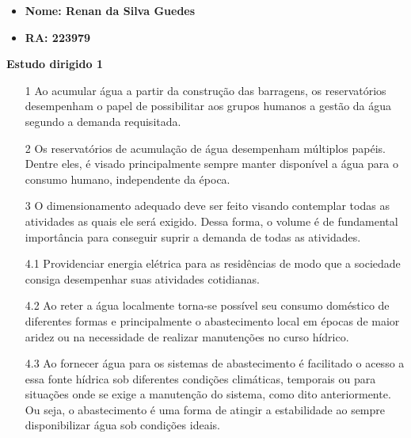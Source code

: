 \documentclass[a4paper, 12pt]{article}
\begin{document}
    \begin{itemize}
        \item\textbf{Nome: Renan da Silva Guedes}
        \item\textbf{RA: 223979}
    \end{itemize}
    
    \begin{center}
        \begin{large}
            \textbf{Estudo dirigido 1}
        \end{large}
    \end{center}
    
    \begin{enumerate}
        \item[1] Ao acumular água a partir da construção das barragens, os reservatórios desempenham o papel de possibilitar aos grupos humanos a gestão da água segundo a demanda requisitada. 
        
        \item[2] Os reservatórios de acumulação de água desempenham múltiplos papéis. Dentre eles, é visado principalmente sempre manter disponível a água para o consumo humano, independente da época.
        
        \item[3] O dimensionamento adequado deve ser feito visando contemplar todas as atividades as quais ele será exigido. Dessa forma, o volume é de fundamental importância para conseguir suprir a demanda de todas as atividades.
        
        \item[4.1] Providenciar energia elétrica para as residências de modo que a sociedade consiga desempenhar suas atividades cotidianas.
        
        \item[4.2] Ao reter a água localmente torna-se possível seu consumo doméstico de diferentes formas e 
        principalmente o abastecimento local em épocas de maior aridez ou na necessidade de realizar manutenções no curso hídrico.
        
        \item[4.3] Ao fornecer água para os sistemas de abastecimento é facilitado o acesso a essa fonte hídrica sob diferentes condições climáticas, temporais ou para situações onde se exige a manutenção do sistema, como dito anteriormente. Ou seja, o abastecimento é uma forma de atingir a estabilidade ao sempre disponibilizar água sob condições ideais.
        

\end{enumerate}
\end{document}
